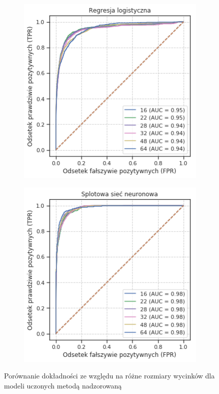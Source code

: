 \documentclass[polish, 13pt]{beamer}
\begin{document}
\begin{frame}
\begin{figure}
  \centering
  \begin{subfigure}[b]{0.45\linewidth}
    \includegraphics[width=\linewidth]{images/logreg_patch_roc_v2}
  \end{subfigure}
  \begin{subfigure}[b]{0.45\linewidth}
    \includegraphics[width=\linewidth]{images/cnn_patch_roc_v2}
  \end{subfigure}
  \caption{Porównanie dokładności ze względu na różne rozmiary wycinków dla modeli uczonych metodą nadzorowaną}
  \label{fig:supervised_patches}
\end{figure}
\end{frame}
\end{document}
